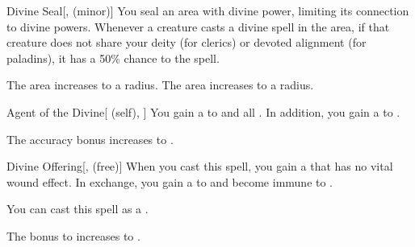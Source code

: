 \lowercase{\hypertarget{spell:Divine Seal}{}}\label{spell:Divine Seal}
\begin{freeability}[Rank 4]{\hypertarget{spell:Divine Seal}{Divine Seal}}[,  (minor)]
You seal an area with divine power, limiting its connection to divine powers.
Whenever a creature casts a divine spell in the area, if that creature does not share your deity (for clerics) or devoted alignment (for paladins), it has a 50\% chance to  the spell.

\rankline
{} The area increases to a \areamed radius.
 The area increases to a \arealarge radius.

\end{freeability}
\vspace{0.25em}



\lowercase{\hypertarget{spell:Agent of the Divine}{}}\label{spell:Agent of the Divine}
\begin{attuneability}[Rank 6]{\hypertarget{spell:Agent of the Divine}{Agent of the Divine}}[ (self), ]
You gain a   to  and all .
In addition, you gain a   to .

\rankline
{} The accuracy bonus increases to .

\end{attuneability}
\vspace{0.25em}



\lowercase{\hypertarget{spell:Divine Offering}{}}\label{spell:Divine Offering}
\begin{freeability}[Rank 6]{\hypertarget{spell:Divine Offering}{Divine Offering}}[,  (free)]
When you cast this spell, you gain a  that has no vital wound effect.
In exchange, you gain a   to  and become immune to .

You can cast this spell as a .

\rankline
{} The bonus to  increases to .

\end{freeability}
\vspace{0.25em}



